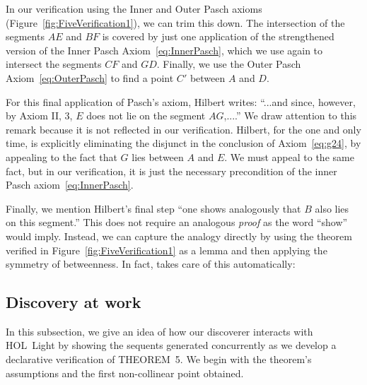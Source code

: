 In our verification using the Inner and Outer Pasch axioms (Figure~\ref{fig:FiveVerification1}), we can trim this down. The intersection of the segments $AE$ and $BF$ is covered by just one application of the strengthened version of the Inner Pasch Axiom~\eqref{eq:InnerPasch}, which we use again to intersect the segments $CF$ and $GD$. Finally, we use the Outer Pasch Axiom~\eqref{eq:OuterPasch} to find a point $C'$ between $A$ and $D$. 

For this final application of Pasch's axiom, Hilbert writes: ``...and since, however, by Axiom II, 3, $E$ does not lie on the segment $AG$,....'' We draw attention to this remark because it is not reflected in our verification. Hilbert, for the one and only time, is explicitly eliminating the disjunct in the conclusion of Axiom~\ref{eq:g24}, by appealing to the fact that $G$ lies between $A$ and $E$. We must appeal to the same fact, but in our verification, it is just the necessary precondition of the inner  Pasch axiom~\eqref{eq:InnerPasch}.

Finally, we mention Hilbert's final step ``one shows analogously that $B$ also lies on this segment.'' This does not require an analogous \emph{proof} as the word ``show'' would imply. Instead, we can capture the analogy directly by using the theorem verified in Figure~\ref{fig:FiveVerification1} as a lemma and then applying the symmetry of betweenness. In fact,  takes care of this automatically:

\linebreak

\subsection{Discovery at work}
In this subsection, we give an idea of how our discoverer interacts with HOL~Light by showing the sequents generated concurrently as we develop a declarative verification of THEOREM~5. We begin with the theorem's assumptions and the first non-collinear point obtained.

\linebreak

